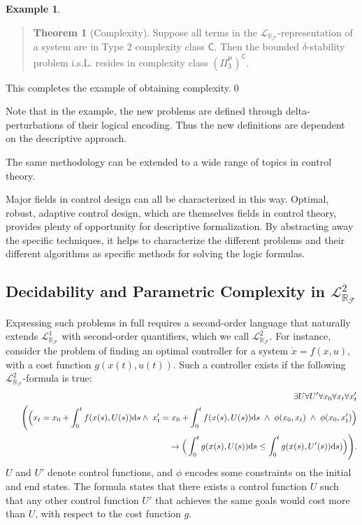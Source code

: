 \documentclass[10pt]{article}
\newcommand{\lrf}{\mathcal{L}_{\mathbb{R}_{\mathcal{F}}}}
\theoremstyle{definition}
\newtheorem{example}{Example}[section]
\newtheorem{theorem}{Theorem}[section]
\begin{document}
\begin{example}
\begin{quote}
\vspace{-.5cm}
\begin{theorem}[Complexity]
Suppose all terms in the $\lrf$-representation of a system are in Type 2 complexity class $\mathsf{C}$.  Then the bounded $\delta$-stability problem i.s.L. resides in complexity class $\mathsf{(\Pi^P_3)^C}$. 
\end{theorem}
\end{quote}
This completes the example of obtaining complexity.\qed
\end{example}
Note that in the example, the new problems are defined through delta-perturbations of their logical encoding. Thus the new definitions are dependent on the descriptive approach. 

The same methodology can be extended to a wide range of topics in control theory. 

Major fields in control design can all be characterized in this way. Optimal, robust, adaptive control design, which are themselves fields in control theory, provides plenty of opportunity for descriptive formalization. By abstracting away the specific techniques, it helps to characterize the different problems and their different algorithms as specific methods for solving the logic formulas. 

\subsection{Decidability and Parametric Complexity in $\lrf^2$} 

Expressing such problems in full requires a second-order language that naturally extends $\lrf^1$ with second-order quantifiers, which we call $\lrf^2$. For instance, consider the problem of finding an optimal controller for a system $\dot x = f({x}, u)$, with a cost function $g(x(t),u(t))$. Such a controller exists if the following $\lrf^2$-formula is true:
\begin{eqnarray*}
& &\exists U \forall U' \forall {x_0}\forall {x_t} \forall {x_t'}\\
& &\Bigg( \Big({x_t} = {x_0} + \int_{0}^t f({x}(s),U(s))\mathrm{d}s \wedge\;  x_t' = x_0 + \int_{0}^t f(x(s),U(s))\mathrm{d}s
\;\wedge\; \phi(x_0, x_t) \;\wedge\; \phi(x_0, x_t')\Big)\\
& &\hspace{6.5cm}\rightarrow \Big(\int_0^t g(x(s),U(s))\mathrm{d}s \leq  \int_0^t g(x(s),U'(s))\mathrm{d}s)\Big) \Bigg).
\end{eqnarray*}
$U$ and $U'$ denote control functions, and $\phi$ encodes some constraints on the initial and end states. The formula states that there exists a control function $U$ such that any other control function $U'$ that achieves the same goals would cost more than $U$, with respect to the cost function $g$. 
\end{document}
